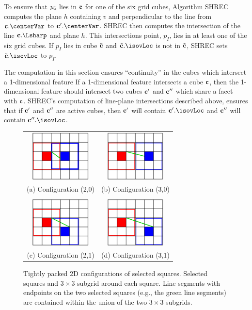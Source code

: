 To ensure that $p_{{\tilde{\mathbf{c}}}}$ lies in ${\tilde{\mathbf{c}}}$ for one of the six grid cubes,
Algorithm SHREC computes the plane $h$ containing $v$
and perpendicular to the line from $\cb.\centerVar$ to $\cb'.\centerVar$.
SHREC then computes the intersection of the line $\cb.\Lsharp$ and plane $h$.
This intersections point, $p_I$, lies in at least one of the six grid cubes.
If $p_I$ lies in cube ${\tilde{\mathbf{c}}}$ and $\tcb.\isovLoc$ is not in ${\tilde{\mathbf{c}}}$,
SHREC sets $\tcb.\isovLoc$ to $p_I$.

The computation in this section ensures ``continuity'' in the cubes
which intersect a 1-dimensional feature
If a 1-dimensional feature intersects a cube $\mathbf{c}$,
then the 1-dimensional feature should intersect two cubes $\mathbf{c}'$ and $\mathbf{c}''$
which share a facet with $\mathbf{c}$.
SHREC's computation of line-plane intersections described above,
ensures that if $\mathbf{c}'$ and $\mathbf{c}''$ are active cubes,
then $\mathbf{c}'$ will contain $\cb'.\isovLoc$ and 
$\mathbf{c}''$ will contain $\cb''.\isovLoc$.


\begin{figure}
\centering
\begin{tabular}{cc}
\includegraphics[width=1.2in]{images/config2D_2_0.eps} \qquad &
\qquad
\includegraphics[width=1.2in]{images/config2D_3_0.eps} \\
(a) Configuration (2,0) & (b) Configuration (3,0) \\
\\
\includegraphics[width=1.2in]{images/config2D_2_1.eps}
\qquad &
\qquad
\includegraphics[width=1.2in]{images/config2D_3_1.eps} \\
(c) Configuration (2,1) & (d) Configuration (3,1)
\end{tabular}
\caption{Tightly packed 2D configurations of selected squares.
Selected squares and $3 \times 3$ subgrid around each square.
Line segments with endpoints on the two selected squares 
(e.g., the green line segments) are contained
within the union of the two $3 \times 3$ subgrids.}
\label{fig:packed2D}
\end{figure}

